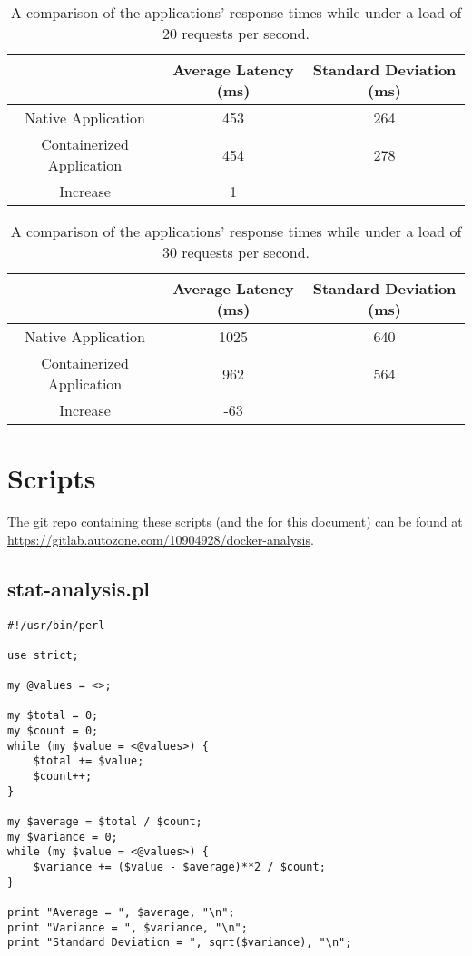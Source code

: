 \documentclass{article}
\begin{document}
\begin{table}[H]
\begin{tabular}{ |c|c|c| }
 \hline
 & Average Latency (ms) & Standard Deviation (ms) \\
 \hline
 Native Application & 453 & 264 \\
 \hline
 Containerized Application & 454 & 278 \\
 \hline\hline
 Increase & 1 & \\
 \hline
\end{tabular}
\caption{A comparison of the applications' response times while under a load of 20 requests per second.}
\label{latency-under-load-20}
\end{table}

\begin{table}[H]
\begin{tabular}{ |c|c|c| }
 \hline
 & Average Latency (ms) & Standard Deviation (ms) \\
 \hline
 Native Application & 1025 & 640 \\
 \hline
 Containerized Application & 962 & 564 \\
 \hline\hline
 Increase & -63 & \\
 \hline
\end{tabular}
\caption{A comparison of the applications' response times while under a load of 30 requests per second.}
\label{latency-under-load-30}
\end{table}

\section{Scripts}
The git repo containing these scripts (and the \latex for this document) can be found at \href{https://gitlab.autozone.com/10904928/docker-analysis}{https://gitlab.autozone.com/10904928/docker-analysis}.

\subsection{stat-analysis.pl}
\begin{verbatim}
#!/usr/bin/perl

use strict;

my @values = <>;

my $total = 0;
my $count = 0;
while (my $value = <@values>) {
    $total += $value;
    $count++;
}

my $average = $total / $count;
my $variance = 0;
while (my $value = <@values>) {
    $variance += ($value - $average)**2 / $count;
}

print "Average = ", $average, "\n";
print "Variance = ", $variance, "\n";
print "Standard Deviation = ", sqrt($variance), "\n";
\end{verbatim}
\end{document}
